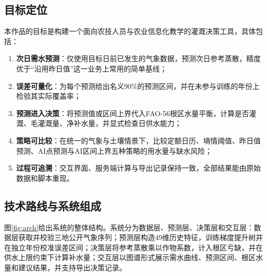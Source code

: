 \subsection{目标定位}
本作品的目标是构建一个面向农技人员与农业信息化教学的灌溉决策工具，具体包括：
\begin{enumerate}
\item \textbf{次日需水预测}：仅使用目标日前已发生的气象数据，预测次日参考蒸散，精度优于“沿用昨日值”这一业务上常用的简单基线；
\item \textbf{误差可量化}：为每个预测给出名义90\%的预测区间，并在未参与训练的年份上检验其实际覆盖率；
\item \textbf{预测进入决策}：将预测值或区间上界代入FAO-56根区水量平衡，计算是否灌溉、毛灌溉量、净补水量，并显式检查日供水能力；
\item \textbf{策略可比较}：在统一的气象与土壤情景下，比较定额日历、墒情阈值、昨日值预测、AI点预测与AI区间上界五种策略的用水量与缺水风险；
\item \textbf{过程可追溯}：交互界面、服务端计算与导出记录保持一致，全部结果能由原始数据和脚本重现。
\end{enumerate}

\subsection{技术路线与系统组成}
图\ref{fig:arch}给出系统的整体结构。系统分为数据层、预测层、决策层和交互层：数据层获取并校验三地公开气象序列；预测层构造49维历史特征，训练梯度提升树并在独立年份校准误差区间；决策层将参考蒸散乘以作物系数，计入根区亏缺，并在供水上限约束下计算补水量；交互层以图谱形式展示需水曲线、预测区间、根区水量和建议结果，并支持导出决策记录。


